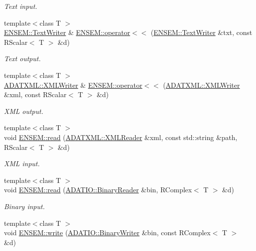 \begin{DoxyCompactItemize}
\begin{DoxyCompactList}\small\item\em Text input. \end{DoxyCompactList}\item 
{\footnotesize template$<$class T $>$ }\\\mbox{\hyperlink{classENSEM_1_1TextWriter}{E\+N\+S\+E\+M\+::\+Text\+Writer}} \& \mbox{\hyperlink{group__rscalar_ga1b0ef216d273bb97e82fce8f99467105}{E\+N\+S\+E\+M\+::operator$<$$<$}} (\mbox{\hyperlink{classENSEM_1_1TextWriter}{E\+N\+S\+E\+M\+::\+Text\+Writer}} \&txt, const R\+Scalar$<$ T $>$ \&d)
\begin{DoxyCompactList}\small\item\em Text output. \end{DoxyCompactList}\item 
{\footnotesize template$<$class T $>$ }\\\mbox{\hyperlink{classADATXML_1_1XMLWriter}{A\+D\+A\+T\+X\+M\+L\+::\+X\+M\+L\+Writer}} \& \mbox{\hyperlink{group__rscalar_ga73069f4953b3397b5fbd94f9b78203fa}{E\+N\+S\+E\+M\+::operator$<$$<$}} (\mbox{\hyperlink{classADATXML_1_1XMLWriter}{A\+D\+A\+T\+X\+M\+L\+::\+X\+M\+L\+Writer}} \&xml, const R\+Scalar$<$ T $>$ \&d)
\begin{DoxyCompactList}\small\item\em X\+ML output. \end{DoxyCompactList}\item 
{\footnotesize template$<$class T $>$ }\\void \mbox{\hyperlink{group__rscalar_ga254ddc2517282f105035865bc1e227dc}{E\+N\+S\+E\+M\+::read}} (\mbox{\hyperlink{classADATXML_1_1XMLReader}{A\+D\+A\+T\+X\+M\+L\+::\+X\+M\+L\+Reader}} \&xml, const std\+::string \&path, R\+Scalar$<$ T $>$ \&d)
\begin{DoxyCompactList}\small\item\em X\+ML input. \end{DoxyCompactList}\item 
{\footnotesize template$<$class T $>$ }\\void \mbox{\hyperlink{group__rcomplex_ga26562c626033349312f9fb8fe7cdabcf}{E\+N\+S\+E\+M\+::read}} (\mbox{\hyperlink{classADATIO_1_1BinaryReader}{A\+D\+A\+T\+I\+O\+::\+Binary\+Reader}} \&bin, R\+Complex$<$ T $>$ \&d)
\begin{DoxyCompactList}\small\item\em Binary input. \end{DoxyCompactList}\item 
{\footnotesize template$<$class T $>$ }\\void \mbox{\hyperlink{group__rcomplex_ga5087feb4530a8e07f00227de0852c625}{E\+N\+S\+E\+M\+::write}} (\mbox{\hyperlink{classADATIO_1_1BinaryWriter}{A\+D\+A\+T\+I\+O\+::\+Binary\+Writer}} \&bin, const R\+Complex$<$ T $>$ \&d)

\end{DoxyCompactItemize}

